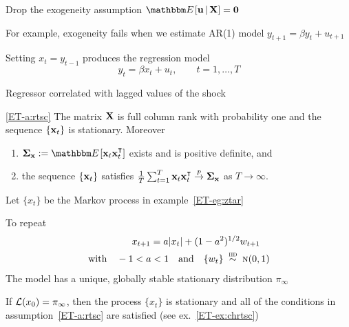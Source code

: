 \begin{frame}

    \vspace{2em}
    Drop the exogeneity assumption
    $\EE[\boldu \given \boldX] = \boldzero$
    
    \vspace{.7em}
    For example,
    exogeneity fails when we  estimate AR(1) model $y_{t+1} =
    \beta y_t + u_{t+1}$ 
    
    \vspace{.7em}
    Setting $x_t = y_{t-1}$ produces the
    regression model
    \begin{equation*}
        \label{eq:ar1reg}
        y_t = \beta x_t + u_t,
        \qquad t=1,\ldots,T
    \end{equation*}
    
    \vspace{.7em}
    Regressor correlated with lagged values of the shock
    
\end{frame}

\begin{frame}

    \vspace{2em}
    \Ass\eqref{ET-a:rtsc}
        The matrix $\mathbf X$ is full column rank with probability one and the
        sequence $\{{\mathbf x}_t\}$ is stationary.  Moreover
        \begin{enumerate}
            \item $\Sigmax := \EE [ \boldx_t \boldx_t^\T ]$ exists and is
                positive definite, and
            \item the sequence $\{{\mathbf x}_t\}$ satisfies 
                $\frac{1}{T} \sum_{t=1}^T \boldx_t \boldx_t^\T \toprob \Sigmax$
                as $T \to \infty$.
        \end{enumerate}
        
\end{frame}

\begin{frame}

    \vspace{2em}
    \Eg
    Let $\{x_t\}$ be the Markov process 
    in example~\ref{ET-eg:ztar}
    
    To repeat
    \begin{align*}
        x_{t+1} = a |x_t| + (1 - a^2)^{1/2} w_{t+1}  
        \quad \\ \text{with} \quad
        -1 < a < 1
        \quad \text{and} \quad
        \{w_t\} \stackrel {\textrm{ {\sc iid }}} {\sim} \textrm{\sc n}(0, 1)
    \end{align*}
    The model has a unique, globally
    stable stationary distribution $\pi_\infty$
    
    \vspace{.7em}
    If $\mathcal L(x_0) = \pi_\infty$,
    then the process $\{x_t\}$ is stationary and all of the conditions in
    assumption~\ref{ET-a:rtsc} are satisfied (see ex.~\ref{ET-ex:chrtsc})
    
\end{frame}

